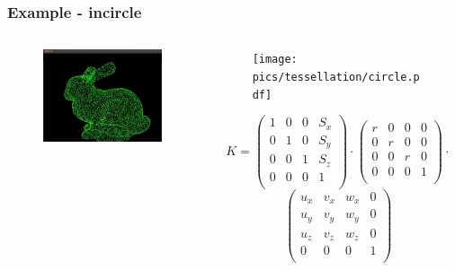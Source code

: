 \begin{frame}[fragile]\frametitle{Example - incircle}
  \begin{columns}[T]
    \begin{column}{.44\textwidth}
	    \begin{figure}[h]
    		\includegraphics[width=5cm,keepaspectratio]{pics/tessellation/ts_circle}
    	\end{figure}
    \end{column}
    \begin{column}{.48\textwidth}
 	    \begin{figure}[h]
    		\texttt{[image: pics/tessellation/circle.pdf]}
    	\end{figure}
{\tiny
$$
K=
\left( 
\begin{array}{cccc} 
1 & 0 & 0 & S_x \\
0 & 1 & 0 & S_y \\
0 & 0 & 1 & S_z \\
0 & 0 & 0 & 1  \\
\end{array}
\right)
\cdot
\left( 
\begin{array}{cccc} 
r & 0 & 0 & 0 \\
0 & r & 0 & 0 \\
0 & 0 & r & 0 \\
0 & 0 & 0 & 1  \\
\end{array}
\right)
\cdot$$
$$
\left( 
\begin{array}{cccc} 
u_x & v_x & w_x & 0 \\
u_y & v_y & w_y & 0 \\
u_z & v_z & w_z & 0 \\
0 & 0 & 0 & 1  \\
\end{array}
\right)
$$
}
    \end{column}
  \end{columns}
\end{frame}

